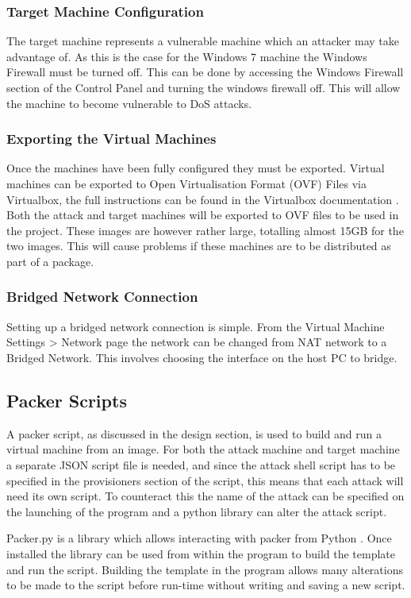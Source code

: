 \subsubsection{Target Machine Configuration}
The target machine represents a vulnerable machine which an attacker may take advantage of. As this is the case for the Windows 7 machine the Windows Firewall must be turned off. This can be done by accessing the Windows Firewall section of the Control Panel and turning the windows firewall off. This will allow the machine to become vulnerable to DoS attacks.

\subsubsection{Exporting the Virtual Machines}
Once the machines have been fully configured they must be exported. Virtual machines can be exported to Open Virtualisation Format (OVF) Files via Virtualbox, the full instructions can be found in the Virtualbox documentation \cite{vbovf}. Both the attack and target machines will be exported to OVF files to be used in the project. These images are however rather large, totalling almost 15GB for the two images. This will cause problems if these machines are to be distributed as part of a package.

\subsubsection{Bridged Network Connection}
Setting up a bridged network connection is simple. From the Virtual Machine Settings > Network page the network can be changed from NAT network to a Bridged Network. This involves choosing the interface on the host PC to bridge. 

\subsection{Packer Scripts}
A packer script, as discussed in the design section, is used to build and run a virtual machine from an image. For both the attack machine and target machine a separate JSON script file is needed, and since the attack shell script has to be specified in the provisioners section of the script, this means that each attack will need its own script. To counteract this the name of the attack can be specified on the launching of the program and a python library can alter the attack script.

Packer.py is a library which allows interacting with packer from Python \cite{packerpy}. Once installed the library can be used from within the program to build the template and run the script. Building the template in the program allows many alterations to be made to the script before run-time without writing and saving a new script.

